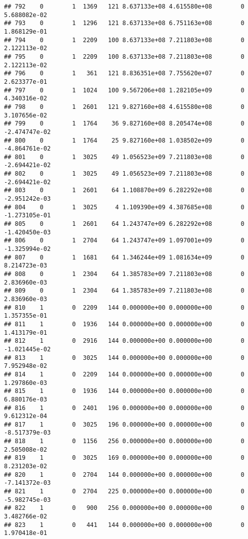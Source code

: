 \documentclass[
]{article}
\begin{document}
\begin{enumerate}
\begin{verbatim}
## 792    0        1  1369   121 8.637133e+08 4.615580e+08        0  5.688082e-02
## 793    0        1  1296   121 8.637133e+08 6.751163e+08        0  1.868129e-01
## 794    0        1  2209   100 8.637133e+08 7.211803e+08        0  2.122113e-02
## 795    0        1  2209   100 8.637133e+08 7.211803e+08        0  2.122113e-02
## 796    0        1   361   121 8.836351e+08 7.755620e+07        0  2.623377e-01
## 797    0        1  1024   100 9.567206e+08 1.282105e+09        0  4.340316e-02
## 798    0        1  2601   121 9.827160e+08 4.615580e+08        0  3.107656e-02
## 799    0        1  1764    36 9.827160e+08 8.205474e+08        0 -2.474747e-02
## 800    0        1  1764    25 9.827160e+08 1.038502e+09        0 -4.864761e-02
## 801    0        1  3025    49 1.056523e+09 7.211803e+08        0 -2.694421e-02
## 802    0        1  3025    49 1.056523e+09 7.211803e+08        0 -2.694421e-02
## 803    0        1  2601    64 1.108870e+09 6.282292e+08        0 -2.951242e-03
## 804    0        1  3025     4 1.109390e+09 4.387685e+08        0 -1.273105e-01
## 805    0        1  2601    64 1.243747e+09 6.282292e+08        0 -1.420450e-03
## 806    0        1  2704    64 1.243747e+09 1.097001e+09        0 -1.325994e-02
## 807    0        1  1681    64 1.346244e+09 1.081634e+09        0  8.214723e-03
## 808    0        1  2304    64 1.385783e+09 7.211803e+08        0  2.836960e-03
## 809    0        1  2304    64 1.385783e+09 7.211803e+08        0  2.836960e-03
## 810    1        0  2209   144 0.000000e+00 0.000000e+00        0  1.357355e-01
## 811    1        0  1936   144 0.000000e+00 0.000000e+00        0  1.413179e-01
## 812    1        0  2916   144 0.000000e+00 0.000000e+00        0 -1.021445e-02
## 813    1        0  3025   144 0.000000e+00 0.000000e+00        0  7.952948e-02
## 814    1        0  2209   144 0.000000e+00 0.000000e+00        0  1.297860e-03
## 815    1        0  1936   144 0.000000e+00 0.000000e+00        0  6.880176e-03
## 816    1        0  2401   196 0.000000e+00 0.000000e+00        0  9.612312e-04
## 817    1        0  3025   196 0.000000e+00 0.000000e+00        0 -8.517379e-03
## 818    1        0  1156   256 0.000000e+00 0.000000e+00        0  2.505008e-02
## 819    1        0  3025   169 0.000000e+00 0.000000e+00        0  8.231203e-02
## 820    1        0  2704   144 0.000000e+00 0.000000e+00        0 -7.141372e-03
## 821    1        0  2704   225 0.000000e+00 0.000000e+00        0 -5.982745e-03
## 822    1        0   900   256 0.000000e+00 0.000000e+00        0  3.482766e-02
## 823    1        0   441   144 0.000000e+00 0.000000e+00        0  1.970418e-01

\end{verbatim}
\end{enumerate}
\end{document}
